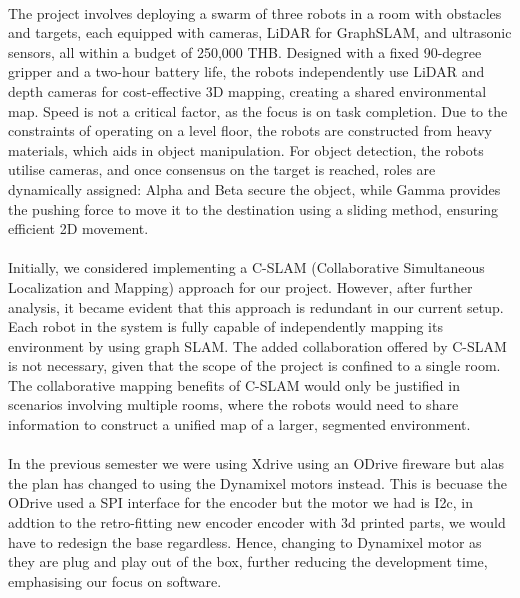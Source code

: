\paragraph*{}
The project involves deploying a swarm of three robots in a room with obstacles and targets, each equipped with cameras, LiDAR for GraphSLAM, and ultrasonic sensors, all within a budget of 250,000 THB. Designed with a fixed 90-degree gripper and a two-hour battery life, the robots independently use LiDAR and depth cameras for cost-effective 3D mapping, creating a shared environmental map. Speed is not a critical factor, as the focus is on task completion. Due to the constraints of operating on a level floor, the robots are constructed from heavy materials, which aids in object manipulation. For object detection, the robots utilise cameras, and once consensus on the target is reached, roles are dynamically assigned: Alpha and Beta secure the object, while Gamma provides the pushing force to move it to the destination using a sliding method, ensuring efficient 2D movement.

\paragraph*{}
Initially, we considered implementing a C-SLAM (Collaborative Simultaneous Localization and Mapping) approach for our project. However, after further analysis, it became evident that this approach is redundant in our current setup. Each robot in the system is fully capable of independently mapping its environment by using graph SLAM. The added collaboration offered by C-SLAM is not necessary, given that the scope of the project is confined to a single room. The collaborative mapping benefits of C-SLAM would only be justified in scenarios involving multiple rooms, where the robots would need to share information to construct a unified map of a larger, segmented environment.

\paragraph*{}
In the previous semester we were using Xdrive using an ODrive fireware but alas the plan has changed to using the Dynamixel motors instead. This is becuase the ODrive used a SPI interface for the encoder but the motor we had is I2c, in addtion to the retro-fitting new encoder encoder with 3d printed parts, we would have to redesign the base regardless. Hence, changing to Dynamixel motor as they are plug and play out of the box, further reducing the development time, emphasising our focus on software.